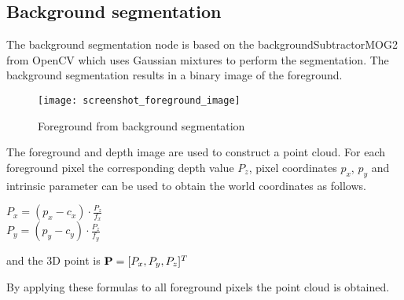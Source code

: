 
\subsection{Background segmentation}


The background segmentation node is based on the backgroundSubtractorMOG2 from OpenCV \cite{BGS} which uses Gaussian mixtures to perform the segmentation. The background segmentation results in a binary image of the foreground. 

\begin{figure}[H]
\begin{center}
\texttt{[image: screenshot\_foreground\_image]}
\caption{Foreground from background segmentation}

\end{center}
\end{figure}


The foreground and depth image are used to construct a point cloud. For each foreground pixel the corresponding depth value $P_z$, pixel coordinates $p_x$, $p_y$ and intrinsic parameter can be used to obtain the world coordinates as follows.

\begin{center}
$\displaystyle P_x = (p_x - c_x) \cdot \frac{P_z}{f_x}$\\ \vspace{10 pt}
$\displaystyle P_y = (p_y - c_y) \cdot \frac{P_z}{f_y}$

and the 3D point is ${\bf P} = [P_x, P_y, P_z]^T$
\end{center}


By applying these formulas to all foreground pixels the point cloud is obtained.


